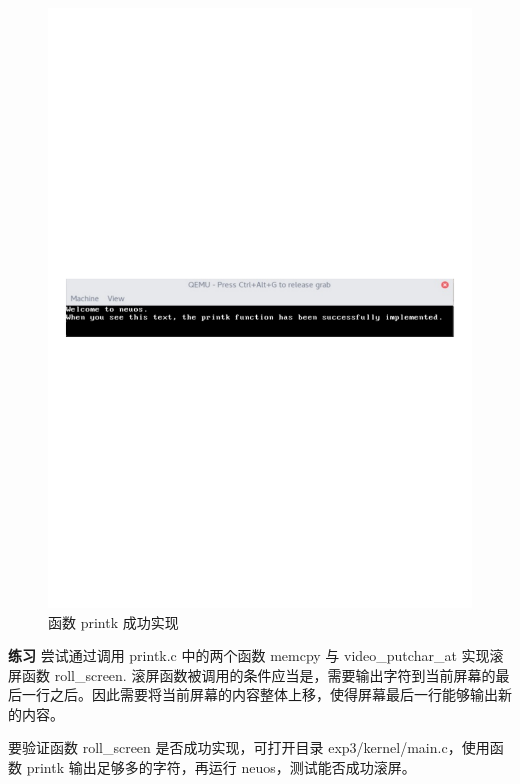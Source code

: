 \begin{figure}[htbp]
    \centering
    \includegraphics[width=\textwidth]{img/函数printk成功实现.pdf}
    \caption{函数 printk 成功实现}
    \label{fig:函数printk成功实现}
\end{figure}

\begin{mdframed}[hidealllines=true,backgroundcolor=gray!20]
\textbf{练习 }尝试通过调用 printk.c 中的两个函数 memcpy 与 video\_putchar\_at 实现滚屏函数 roll\_screen. 滚屏函数被调用的条件应当是，需要输出字符到当前屏幕的最后一行之后。因此需要将当前屏幕的内容整体上移，使得屏幕最后一行能够输出新的内容。

要验证函数 roll\_screen 是否成功实现，可打开目录 exp3/kernel/main.c，使用函数 printk 输出足够多的字符，再运行 neuos，测试能否成功滚屏。
\end{mdframed}

